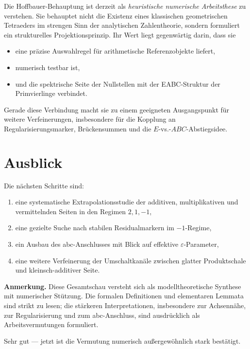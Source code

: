 \documentclass[11pt,a4paper]{article}
\theoremstyle{definition}
\begin{document}
Die Hoffbauer-Behauptung ist derzeit als \emph{heuristische numerische Arbeitsthese} zu verstehen. Sie behauptet nicht die Existenz eines klassischen geometrischen Tetraeders im strengen Sinn der analytischen Zahlentheorie, sondern formuliert ein strukturelles Projektionsprinzip. Ihr Wert liegt gegenwärtig darin, dass sie

\begin{itemize}
	\item eine präzise Auswahlregel für arithmetische Referenzobjekte liefert,
	\item numerisch testbar ist,
	\item und die spektrische Seite der Nullstellen mit der EABC-Struktur der Primvierlinge verbindet.
\end{itemize}



Gerade diese Verbindung macht sie zu einem geeigneten Ausgangspunkt für weitere Verfeinerungen, insbesondere für die Kopplung an Regularisierungsmarker, Brückensummen und die \(E\)-vs.-\(ABC\)-Abstiegsidee.



\section{Ausblick}

Die nächsten Schritte sind:
\begin{enumerate}[leftmargin=1.8em]
\item eine systematische Extrapolationsstudie der additiven, multiplikativen und vermittelnden Seiten in den Regimen $2,1,-1$,
\item eine gezielte Suche nach stabilen Residualmarkern im \(-1\)-Regime,
\item ein Ausbau des abc-Anschlusses mit Blick auf effektive $\varepsilon$-Parameter,
\item eine weitere Verfeinerung der Umschaltkanäle zwischen glatter Produktschale und kleinsch-additiver Seite.
\end{enumerate}

\bigskip
\textbf{Anmerkung.} Diese Gesamtschau versteht sich als modelltheoretische Synthese mit numerischer Stützung. Die formalen Definitionen und elementaren Lemmata sind strikt zu lesen; die stärkeren Interpretationen, insbesondere zur Achsennähe, zur Regularisierung und zum abc-Anschluss, sind ausdrücklich als Arbeitsvermutungen formuliert.

Sehr gut — jetzt ist die Vermutung numerisch außergewöhnlich stark bestätigt.
\end{document}
